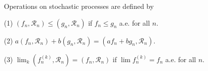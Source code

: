 Operations on stochastic processes are defined by

(1) $(f_n, \mathcal{R}_n) \leq (g_n, \mathcal{R}_n)$ if $f_n \leq g_n$ a.e. for all $n$.

(2) $a(f_n, \mathcal{R}_n) + b(g_n, \mathcal{R}_n) = (af_n + bg_n, \mathcal{R}_n)$.

(3) $\lim_k (f_n^{(k)}, \mathcal{R}_n) = (f_n, \mathcal{R}_n)$ if $\lim f_n^{(k)} = f_n$ a.e. for all $n$.
